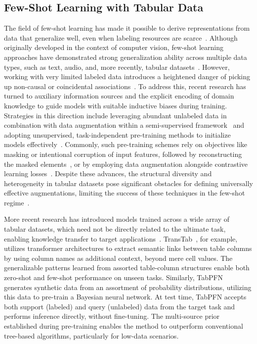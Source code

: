 \subsection{Few-Shot Learning with Tabular Data} The field of few-shot learning has made it possible to derive representations from data that generalize well, even when labeling resources are scarce~\cite{chen2018closer}. Although originally developed in the context of computer vision, few-shot learning approaches have demonstrated strong generalization ability across multiple data types, such as text, audio, and, more recently, tabular datasets~\cite{majumder2022few,nam2023stunt,schick2021exploiting}. However, working with very limited labeled data introduces a heightened danger of picking up non-causal or coincidental associations~\cite{bartlett2021deep}. To address this, recent research has turned to auxiliary information sources and the explicit encoding of domain knowledge to guide models with suitable inductive biases during training. Strategies in this direction include leveraging abundant unlabeled data in combination with data augmentation within a semi-supervised framework~\cite{ucar2021subtab,yoon2020vime} and adopting unsupervised, task-independent pre-training methods to initialize models effectively~\cite{somepalli2021saint}. Commonly, such pre-training schemes rely on objectives like masking or intentional corruption of input features, followed by reconstructing the masked elements~\cite{arik2021tabnet,majmundar2022met}, or by employing data augmentation alongside contrastive learning losses~\cite{bahri2022scarf,chen2020simple}. Despite these advances, the structural diversity and heterogeneity in tabular datasets pose significant obstacles for defining universally effective augmentations, limiting the success of these techniques in the few-shot regime~\cite{nam2023stunt}. 

More recent research has introduced models trained across a wide array of tabular datasets, which need not be directly related to the ultimate task, enabling knowledge transfer to target applications~\cite{zhang2023generative,levin2022transfer,zhu2023xtab}. TransTab~\cite{wang2022transtab}, for example, utilizes transformer architectures to extract semantic links between table columns by using column names as additional context, beyond mere cell values. The generalizable patterns learned from assorted table-column structures enable both zero-shot and few-shot performance on unseen tasks. Similarly, TabPFN~\cite{hollmann2022tabpfn} generates synthetic data from an assortment of probability distributions, utilizing this data to pre-train a Bayesian neural network. At test time, TabPFN accepts both support (labeled) and query (unlabeled) data from the target task and performs inference directly, without fine-tuning. The multi-source prior established during pre-training enables the method to outperform conventional tree-based algorithms, particularly for low-data scenarios.

